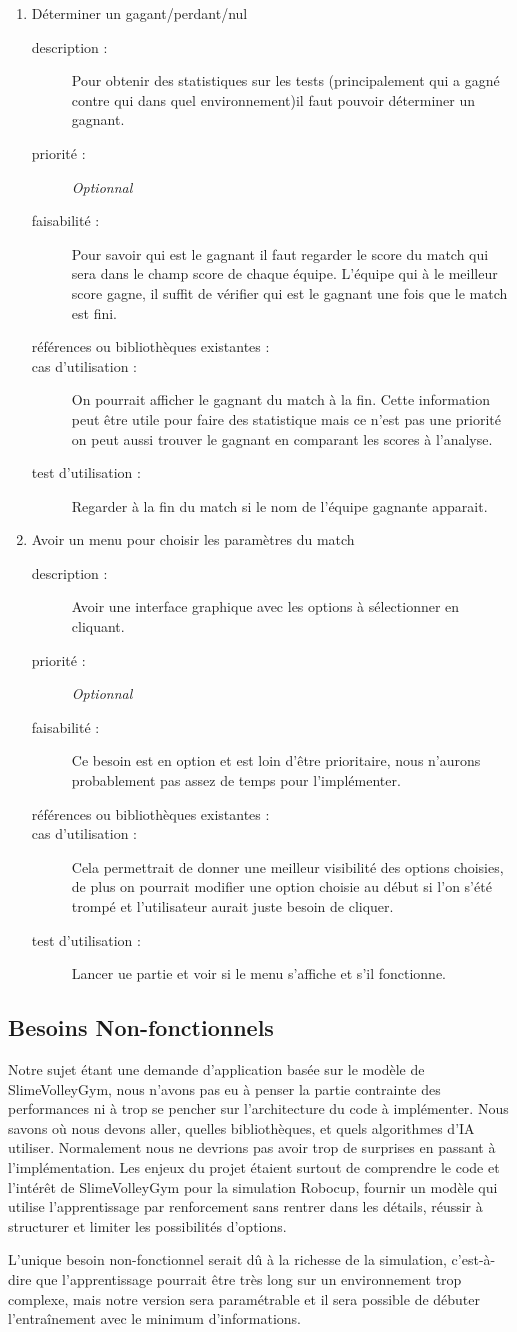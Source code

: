 \documentclass[11pt, a4paper]{article}
\newcommand{\besoinItem}[7]{
    \item #1
    \begin{description}
        \item[description :]
        #2 
        \item[priorité :]
        #3
        \item[faisabilité :]
        #4
        \item[références ou bibliothèques existantes :]
        #5
        \item[cas d'utilisation :]
        #6
        \item[test d'utilisation :]      
        #7 
    \end{description}
}
\begin{document}
\begin{enumerate}
   \besoinItem{Déterminer un gagant/perdant/nul}
   {Pour obtenir des statistiques sur les tests (principalement qui a gagné contre qui dans quel environnement)il faut pouvoir déterminer un gagnant.}
   {\textit{Optionnal}}
   {Pour savoir qui est le gagnant il faut regarder le score du match qui sera dans le champ score de chaque équipe. L'équipe qui à le meilleur score gagne, il suffit de vérifier qui est le gagnant une fois que le match est fini. }
   {}
   {On pourrait afficher le gagnant du match à la fin. Cette information peut être utile pour faire des statistique mais ce n'est pas une priorité on peut aussi trouver le gagnant en comparant les scores à l'analyse.}
   {Regarder à la fin du match si le nom de l'équipe gagnante apparait.}
   
     
   \besoinItem{Avoir un menu pour choisir les paramètres du match}
   {Avoir une interface graphique avec les options à sélectionner en cliquant.  }{\textit{Optionnal}}
   {Ce besoin est en option et est loin d'être prioritaire, nous n'aurons probablement pas assez de temps pour l'implémenter.}
   {}
   {Cela permettrait de donner une meilleur visibilité des options choisies, de plus on pourrait modifier une option choisie au début si l'on s'été trompé et l'utilisateur aurait juste besoin de cliquer.}
   {Lancer ue partie et voir si le menu s'affiche et s'il fonctionne.}
  
\end{enumerate}
\subsection{Besoins Non-fonctionnels}
Notre sujet étant une demande d'application basée sur le modèle de SlimeVolleyGym, nous n'avons pas eu à penser la partie contrainte des performances ni à trop se pencher sur l'architecture du code à implémenter. Nous savons où nous devons aller, quelles bibliothèques, et quels algorithmes d'IA  utiliser. Normalement nous ne devrions pas avoir trop de surprises en passant à l'implémentation. Les enjeux du projet étaient surtout de comprendre le code et l'intérêt de SlimeVolleyGym pour la simulation Robocup, fournir un modèle qui utilise l'apprentissage par renforcement sans rentrer dans les détails, réussir à structurer et limiter les possibilités d'options. 

L'unique besoin non-fonctionnel serait dû à la richesse de la simulation, c'est-à-dire que l'apprentissage pourrait être très long sur un environnement trop complexe, mais notre version sera paramétrable et il sera possible de débuter l'entraînement avec le minimum d'informations. 
\end{document}

